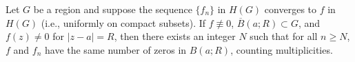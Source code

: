 Let $G$ be a region and suppose the sequence $\{f_n\}$ in $H(G)$ converges to $f$ in $H(G)$ (i.e., uniformly on compact subsets). If $f \not\equiv 0$, $\overline{B}(a; R) \subset G$, and $f(z) \neq 0$ for $|z-a| = R$, then there exists an integer $N$ such that for all $n \geq N$, $f$ and $f_n$ have the same number of zeros in $B(a; R)$, counting multiplicities.
